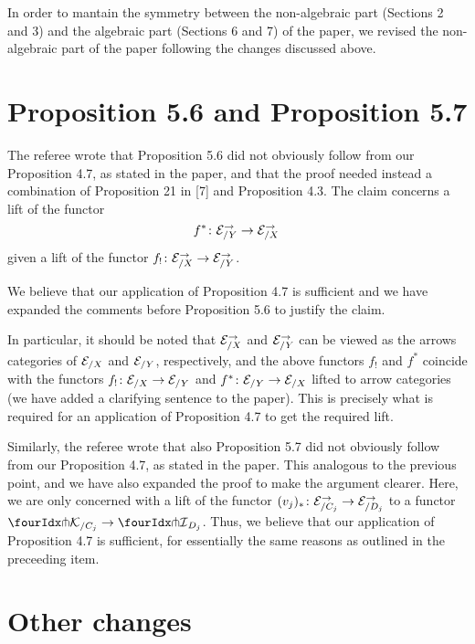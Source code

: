 \documentclass[reqno,10pt,a4paper,oneside,draft]{amsart}
\begin{document}
In order to mantain the symmetry between the non-algebraic part (Sections 2 and 3) and the algebraic part (Sections 6 and 7) 
of the paper, we revised  the non-algebraic part of the paper following the changes discussed above.  



\section*{Proposition 5.6 and Proposition 5.7}

The referee wrote that Proposition 5.6  did not obviously follow from our Proposition 4.7, as stated in the paper, and that the proof needed instead a combination of Proposition 21 in [7] and Proposition 4.3.
The claim concerns a lift of the functor
\[
f^* \co \cal{E}_{/Y}^\to \to \cal{E}_{/X}^\to \, 
\] 
given a lift of the functor $f_! \co \cal{E}_{/X}^\to \to \cal{E}_{/Y}^\to$.

We believe that our application of Proposition 4.7 is sufficient and we have expanded the comments before Proposition 5.6 to
justify the claim. 

In particular, it should be noted that $\cal{E}_{/X}^\to$ and $\cal{E}_{/Y}^\to$ can be viewed as the arrows categories of $\cal{E}_{/X}$ and $\cal{E}_{/Y}$, respectively, and the above functors $f_!$ and $f^*$ coincide with the functors $f_! \co \cal{E}_{/X} \to \cal{E}_{/Y}$ and $f^* \co \cal{E}_{/Y} \to \cal{E}_{/X}$ lifted to arrow categories (we have added a clarifying sentence to the paper).
This is precisely what is required for an application of Proposition 4.7 to get the required lift.

Similarly, the referee wrote that also Proposition 5.7  did not obviously follow from our Proposition 4.7, as stated in the paper.
This analogous to the previous point, and we have also expanded the proof to make the argument clearer. Here, we are only
concerned with a lift of the functor $(v_j)_* \co \cal{E}_{/C_j}^\to \to \cal{E}_{/D_j}^\to$ to a functor $\liftr{\cal{K}}_{/C_j} \to \liftr{\cal{I}}_{D_j}$. Thus, we believe that our application of Proposition 4.7 is sufficient, for essentially the same reasons as outlined in the preceeding item.








\section*{Other changes} 
\end{document}
